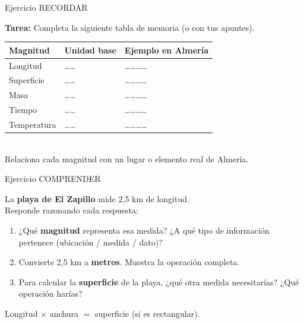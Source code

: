 \documentclass[aspectratio=169, 10pt, spanish]{beamer}
\begin{document}

\begin{frame}{Ejercicio RECORDAR}
  \quad{}
  \vspace{4pt}
  \begin{recordarbox}
    \AlmFontSmall
    \textbf{Tarea:} Completa la siguiente tabla de memoria
    (o con tus apuntes).\\[6pt]
    \begin{tabular}{@{}lll@{}}
      \toprule
      \textbf{Magnitud} & \textbf{Unidad base} & \textbf{Ejemplo en Almería}\\
      \midrule
      Longitud     & \ldots\ldots & \ldots\ldots\ldots\ldots\\[4pt]
      Superficie   & \ldots\ldots & \ldots\ldots\ldots\ldots\\[4pt]
      Masa         & \ldots\ldots & \ldots\ldots\ldots\ldots\\[4pt]
      Tiempo       & \ldots\ldots & \ldots\ldots\ldots\ldots\\[4pt]
      Temperatura  & \ldots\ldots & \ldots\ldots\ldots\ldots\\
      \bottomrule
    \end{tabular}
    \\[6pt]
    Relaciona cada magnitud con un lugar o elemento real de Almería.
  \end{recordarbox}
\end{frame}

\begin{frame}{Ejercicio COMPRENDER}
  \quad{}
  \vspace{4pt}
  \begin{comprenderbox}
    \AlmFontSmall
    La \textbf{playa de El Zapillo} mide 2,5 km de longitud.\\[6pt]
    Responde razonando cada respuesta:
    \begin{enumerate}
      \item ¿Qué \textbf{magnitud} representa esa medida?
            ¿A qué tipo de información pertenece
            (ubicación / medida / dato)?
      \item Convierte 2,5 km a \textbf{metros}.
            Muestra la operación completa.
      \item Para calcular la \textbf{superficie} de la playa,
            ¿qué otra medida necesitarías?
            ¿Qué operación harías?
    \end{enumerate}
  \end{comprenderbox}
  \vspace{4pt}
  \begin{notabox}[Pista]
    \AlmFontFootnote
    Longitud $\times$ anchura $=$ superficie (si es rectangular).
  \end{notabox}
\end{frame}
\end{document}
